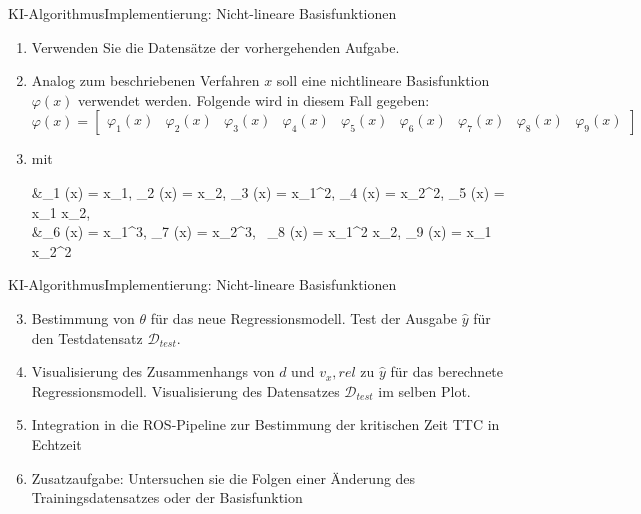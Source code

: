 \documentclass[169, handout	]{THIbeamer} %
\begin{document}
	\begin{frame}{KI-Algorithmus}{Implementierung: Nicht-lineare Basisfunktionen}
		\begin{enumerate}
			\item Verwenden Sie die Datensätze der vorhergehenden Aufgabe.
			\item Analog zum beschriebenen Verfahren $x$ soll eine nichtlineare Basisfunktion $\varphi (x)$ verwendet werden. Folgende wird in diesem Fall gegeben:
			\begin{equation*}
				\varphi (x) = 
				\begin{bmatrix}
					\varphi_1(x) & \varphi_2(x) & \varphi_3(x) & \varphi_4(x) & \varphi_5(x) &
					\varphi_6(x) & \varphi_7(x) & \varphi_8(x) & \varphi_9(x)
				\end{bmatrix}
			\end{equation*}
			\item[] mit
			\begin{flalign}
				&\varphi_1 (x) = x_1, \hspace{0.2 cm} \varphi_2 (x) = x_2, \hspace{0.2 cm} 						\varphi_3 (x) = x_1^2, \hspace{0.2 cm} \varphi_4 (x) = x_2^2, \hspace{0.2 cm} 
				\varphi_5 (x) = x_1 x_2, \nonumber \\
				&\varphi_6 (x) = x_1^3,\hspace{0.2 cm} \varphi_7 (x) = x_2^3,\hspace{0.2 cm} \
				\varphi_8 (x) = x_1^2 x_2, \hspace{0.2 cm}  \varphi_9 (x) = x_1 x_2^2 \nonumber
			\end{flalign}
		\end{enumerate}
	\end{frame}
	\begin{frame}{KI-Algorithmus}{Implementierung: Nicht-lineare Basisfunktionen}
		\begin{enumerate}
			\setcounter{enumi}{2}	
			\item Bestimmung von $\theta$ für das neue Regressionsmodell. Test der Ausgabe $\hat{y}$ für den Testdatensatz $\mathcal{D}_{test}$.
			\item Visualisierung des Zusammenhangs von $d$ und $v_x,rel$ zu $\hat{y}$ für das berechnete Regressionsmodell. Visualisierung des Datensatzes $\mathcal{D}_{test}$ im selben Plot.
			\item Integration in die ROS-Pipeline zur Bestimmung der kritischen Zeit TTC in Echtzeit
			\item Zusatzaufgabe: Untersuchen sie die Folgen einer Änderung des Trainingsdatensatzes oder der Basisfunktion
		\end{enumerate}
	\end{frame}
\end{document}
